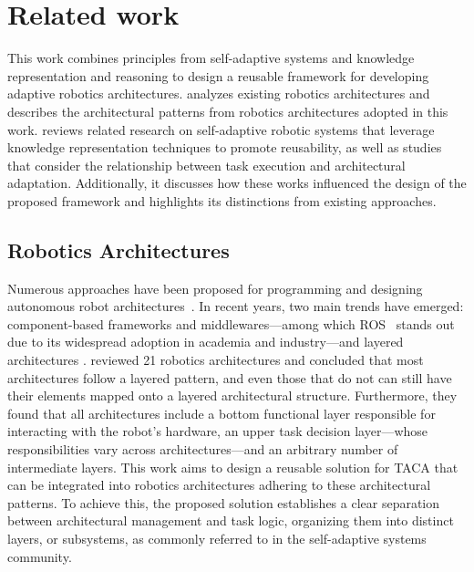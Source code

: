 \section{Related work}\label{sec:rosa:related_works}

This work combines principles from self-adaptive systems and knowledge representation and reasoning to design a reusable framework for developing adaptive robotics architectures.  analyzes existing robotics architectures and describes the architectural patterns from robotics architectures adopted in this work.  reviews related research on self-adaptive robotic systems that leverage knowledge representation techniques to promote reusability, as well as studies that consider the relationship between task execution and architectural adaptation. Additionally, it discusses how these works influenced the design of the proposed framework and highlights its distinctions from existing approaches.

\subsection{Robotics Architectures}\label{sec:related_rob_archs}

Numerous approaches have been proposed for programming and designing autonomous robot architectures~\mbox{\citep{Kortenkamp2016}}. In recent years, two main trends have emerged: component-based frameworks and middlewares---among which ROS~\cite{ros2} stands out due to its widespread adoption in academia and industry---and layered architectures \mbox{\citep{barnett2022architectural}}. \mbox{\cite{barnett2022architectural}} reviewed 21 robotics architectures and concluded that most architectures follow a layered pattern, and even those that do not can still have their elements mapped onto a layered architectural structure. Furthermore, they found that all architectures include a bottom functional layer responsible for interacting with the robot's hardware, an upper task decision layer---whose responsibilities vary across architectures---and an arbitrary number of intermediate layers. This work aims to design a reusable solution for TACA that can be integrated into robotics architectures adhering to these architectural patterns. To achieve this, the proposed solution establishes a clear separation between architectural management and task logic, organizing them into distinct layers, or subsystems, as commonly referred to in the self-adaptive systems community. %

